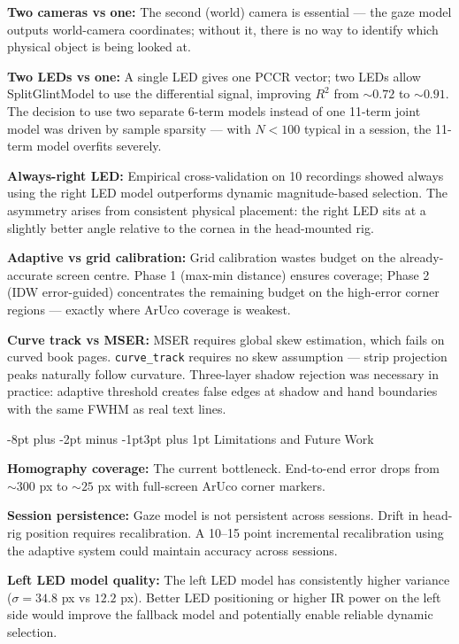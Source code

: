 \documentclass[10pt,twocolumn]{article}
\makeatletter
\renewcommand\section{\@startsection{section}{1}{\z@}%
  {-8pt plus -2pt minus -1pt}{3pt plus 1pt}%
  {\normalfont\large\bfseries}}
\makeatother
\begin{document}
\textbf{Two cameras vs one:} The second (world) camera is essential — the gaze model outputs world-camera coordinates; without it, there is no way to identify which physical object is being looked at.

\textbf{Two LEDs vs one:} A single LED gives one PCCR vector; two LEDs allow SplitGlintModel to use the differential signal, improving $R^2$ from ${\sim}0.72$ to ${\sim}0.91$. The decision to use two separate 6-term models instead of one 11-term joint model was driven by sample sparsity — with $N < 100$ typical in a session, the 11-term model overfits severely.

\textbf{Always-right LED:} Empirical cross-validation on 10 recordings showed always using the right LED model outperforms dynamic magnitude-based selection. The asymmetry arises from consistent physical placement: the right LED sits at a slightly better angle relative to the cornea in the head-mounted rig.

\textbf{Adaptive vs grid calibration:} Grid calibration wastes budget on the already-accurate screen centre. Phase 1 (max-min distance) ensures coverage; Phase 2 (IDW error-guided) concentrates the remaining budget on the high-error corner regions — exactly where ArUco coverage is weakest.

\textbf{Curve track vs MSER:} MSER requires global skew estimation, which fails on curved book pages. \texttt{curve\_track} requires no skew assumption — strip projection peaks naturally follow curvature. Three-layer shadow rejection was necessary in practice: adaptive threshold creates false edges at shadow and hand boundaries with the same FWHM as real text lines.

\section{Limitations and Future Work}

\textbf{Homography coverage:} The current bottleneck. End-to-end error drops from ${\sim}300$ px to ${\sim}25$ px with full-screen ArUco corner markers.

\textbf{Session persistence:} Gaze model is not persistent across sessions. Drift in head-rig position requires recalibration. A 10--15 point incremental recalibration using the adaptive system could maintain accuracy across sessions.

\textbf{Left LED model quality:} The left LED model has consistently higher variance ($\sigma = 34.8$ px vs $12.2$ px). Better LED positioning or higher IR power on the left side would improve the fallback model and potentially enable reliable dynamic selection.
\end{document}
